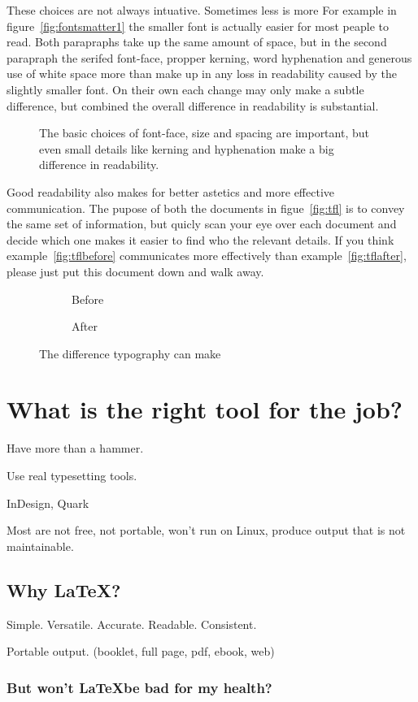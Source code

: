 \documentclass[12pt]{scrartcl}
\newcommand{\pdfsample}[4]{%
		\begin{figure}[h]
			\centering
			\begin{minipage}[b]{.45\textwidth}
				\raggedleft
				\shadowbox{\texttt{[image: \#2]}}
			\end{minipage}\hspace{2\columnsep}
			\begin{minipage}[b]{.45\textwidth}
				\caption{#3}
				\label{fig:#4}
				\vspace{1ex}
			\end{minipage}
		\end{figure}
	}
\newcommand{\pdfcompare}[5]{%
		\begin{figure}[h]
			\centering
			\begin{subfigure}[b]{0.45\textwidth}
				\shadowbox{\texttt{[image: \#2]}}
				\caption{Before}
				\label{fig:#5before}
			\end{subfigure}\quad%
			\begin{subfigure}[b]{0.45\textwidth}
				\shadowbox{\texttt{[image: \#3]}}
				\caption{After}
				\label{fig:#5after}
			\end{subfigure}
			\caption{#4}
			\label{fig:#5}
		\end{figure}
	}
\begin{document}
These choices are not always intuative. Sometimes less is more For example in
figure~\vref{fig:fontsmatter1} the smaller font is actually easier for most
peaple to read. Both parapraphs take up the same amount of space, but in the
second parapraph the serifed font-face, propper kerning, word hyphenation and
generous use of white space more than make up in any loss in readability caused
by the slightly smaller font. On their own each change may only make a subtle
difference, but combined the overall difference in readability is substantial.

\pdfsample{1}{../gallery/fontsmatter.pdf}{The basic choices of font-face, size and spacing are
			important, but even small details like kerning and hyphenation make a big
			difference in readability.}{fontsmatter1}

Good readability also makes for better astetics and more effective
communication. The pupose of both the documents in figue~\vref{fig:tfl} is to convey
the same set of information, but quicly scan your eye over each document and
decide which one makes it easier to find who the relevant details. If you think
example~\vref{fig:tflbefore} communicates more effectively than
example~\vref{fig:tflafter}, please just put this document down and walk away.

\pdfcompare{1}{../gallery/tfl_sample_pleading_before.pdf}{../gallery/tfl_sample_pleading_after.pdf}{The difference typography can make\cite{tflpleading}}{tfl}

\section{What is the right tool for the job?}

Have more than a hammer.

Use real typesetting tools.

InDesign, Quark

Most are not free, not portable, won't run on Linux, produce output that is not
maintainable.

\subsection{Why \LaTeX?}

Simple. Versatile. Accurate. Readable. Consistent.

Portable output. (booklet, full page, pdf, ebook, web)

\subsubsection{But won't \LaTeX be bad for my health?}
\end{document}
